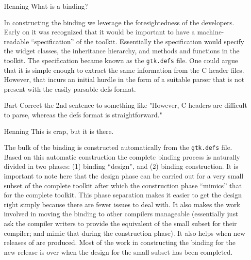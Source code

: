 \documentclass[workingdraft]{usetex-v1}
\begin{document}
\begin{ednote}{Henning}
  What is a binding?
\end{ednote}

In constructing the \mgtk binding we leverage the foresightedness of
the \gtk developers. Early on it was recognized that it would be
important to have a machine-readable ``specification'' of the toolkit.
Essentially the specification would specify the widget classes, the
inheritance hierarchy, and methods and functions in the toolkit. The
specification became known as the \texttt{gtk.defs} file. One could
argue that it is simple enough to extract the same information from
the C header files. However, that incurs an initial hurdle in the
form of a suitable parser that is not present with the easily parsable
defs-format.
\begin{ednote}{Bart}
  Correct the 2nd sentence to something like "However, C headers are
  difficult to parse, whereas the defs format is straightforward."
\end{ednote}


\begin{ednote}{Henning} This is crap, but it is there. \end{ednote}

The bulk of the \mgtk binding is constructed automatically from the
\texttt{gtk.defs} file. Based on this automatic construction the
complete binding process is naturally divided in two phases: (1)
binding ``design'', and (2) binding construction. It is important to
note here that the design phase can be carried out for a very small
subset of the complete toolkit after which the construction phase
``mimics'' that for the complete toolkit.
This phase separation makes it easier to get the design right simply
because there are fewer issues to deal with.  It also makes the work
involved in moving the binding to other \sml compilers manageable
(essentially just ask the compiler writers to provide the equivalent
of the small subset for their compiler; and mimic that during the
construction phase). It also helps when new releases of \gtk are
produced. Most of the work in constructing the binding for the new
release is over when the design for the small subset has been completed.
\end{document}
